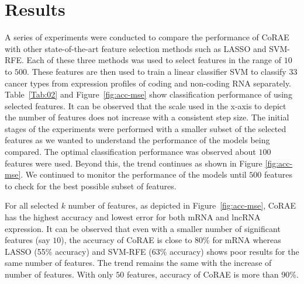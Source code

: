 \documentclass{bioinfo}
\begin{document}
\section{Results}
A series of experiments were conducted to compare the performance of CoRAE with other state-of-the-art feature selection methods such as LASSO and SVM-RFE.
Each of these three methods was used to select features in the range of $10$ to $500$.
These features are then used to train a linear classifier SVM to classify 33 cancer types from expression profiles of coding and non-coding RNA separately. 
Table~\ref{Tab:02} and Figure~\ref{fig:acc-mse} show classification performance of using selected features. It can be observed that the scale used in the x-axis to depict the number of features does not increase with a consistent step size.
The initial stages of the experiments were performed with a smaller subset of the selected features as we wanted to understand the performance of the models being compared.
The optimal classification performance was observed about $100$ features were used.
Beyond this, the trend continues as shown in Figure \ref{fig:acc-mse}. We continued to monitor the performance of the models until $500$ features to check for the best possible subset of features. 

For all selected $k$ number of features, as depicted in Figure~\ref{fig:acc-mse}, CoRAE has the highest accuracy and lowest error for both mRNA and lncRNA expression.
It can be observed that even with a smaller number of significant features (say $10$), the accuracy of CoRAE is close to 80\%  for mRNA whereas LASSO (55\% accuracy) and SVM-RFE (63\% accuracy) shows poor results for the same number of features.
The trend remains the same with the increase of number of features. With only $50$ features, accuracy of CoRAE is more than 90\%.
\end{document}
